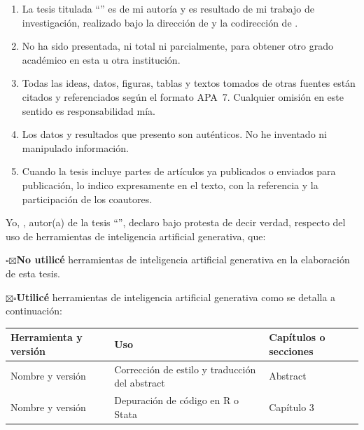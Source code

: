 \begin{enumerate}
  \item La tesis titulada \enquote{\titulotesis} es de mi autoría y es
        resultado de mi trabajo de investigación, realizado bajo la
        dirección de \director{} y la codirección de \codirector.
  \item No ha sido presentada, ni total ni parcialmente, para obtener otro
        grado académico en esta u otra institución.
  \item Todas las ideas, datos, figuras, tablas y textos tomados de otras
        fuentes están citados y referenciados según el formato APA~7.
        Cualquier omisión en este sentido es responsabilidad mía.
  \item Los datos y resultados que presento son auténticos. No he inventado
        ni manipulado información.
  \item Cuando la tesis incluye partes de artículos ya publicados o enviados
        para publicación, lo indico expresamente en el texto, con la
        referencia y la participación de los coautores.
\end{enumerate}

\firmadeclaracion

\clearpage
{}

Yo, \textbf{\autortesis}, autor(a) de la tesis \enquote{\titulotesis},
declaro bajo protesta de decir verdad, respecto del uso de herramientas de
inteligencia artificial generativa, que:

\ifusoia$\square$\else$\boxtimes$\fi\enspace \textbf{No utilicé} herramientas
de inteligencia artificial generativa en la elaboración de esta tesis.

\ifusoia$\boxtimes$\else$\square$\fi\enspace \textbf{Utilicé} herramientas
de inteligencia artificial generativa\ifusoia{} como se detalla a
continuación:

\begin{center}\small
\begin{tabular}{p{3.8cm}p{7.6cm}p{4cm}}
  \toprule
  Herramienta y versión & Uso & Capítulos o secciones \\
  \midrule
  Nombre y versión & Corrección de estilo y traducción del abstract & Abstract \\
  Nombre y versión & Depuración de código en R o Stata & Capítulo 3 \\
  \bottomrule
\end{tabular}
\end{center}

